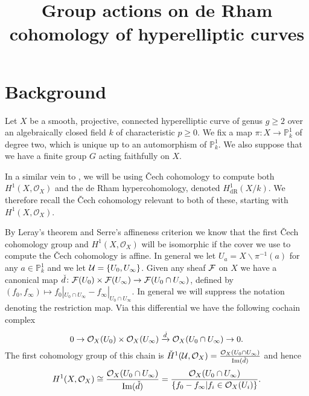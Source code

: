 \documentclass[draft, 11pt]{article} %
\title{Group actions on de Rham cohomology of hyperelliptic curves}
\author{}
\theoremstyle{plain}
\theoremstyle{remark}
\newcommand{\cO}{{\cal O}}
\newcommand{\cech}{\v{C}ech }
\newcommand{\hone}{H^1(X,\mathcal{O}_X)}
\newcommand{\cechhone}{\check{H}^1(\mathcal U,\mathcal O_X)}
\newcommand{\derhamhone}{H_{\text {dR}}^1(X/k)}
\DeclareMathOperator{\Ima}{Im}
\begin{document}
\maketitle

\listoftodos

\section{Background}


Let $X$ be a smooth, projective, connected hyperelliptic curve of genus $g \geq 2$ over an algebraically closed field $k$ of characteristic $p \geq 0$.
We  fix a map $\pi \colon X \rightarrow \mathbb P_k^1$ of degree two, which is unique up to an automorphism of $\mathbb P_k^1$.
We also suppose that we have a finite group $G$ acting faithfully on $X$.

In a similar vein to \cite{canonicalrepresentation}, we will be using \cech cohomology to compute both $\hone$ and the de Rham hypercohomology, denoted $\derhamhone$.
We therefore recall the \cech cohomology relevant to both of these, starting with $\hone$.

By Leray's theorem \cite[Thm 5.2.12]{liu} and Serre's affineness criterion \cite[Thm 5.2.23]{liu} we know that the first \cech cohomology group and $\hone$ will be isomorphic if the cover we use to compute the \cech cohomology is affine.
In general we let $U_a = X \backslash \pi^{-1}(a)$ for any $a \in \mathbb P_k^1$ and we let ${\cal U} = \{ U_0, U_\infty\}$.
Given any sheaf $\cal F$ on $X$ we have a canonical map $\check{d}\colon {\cal F}(U_0) \times {\cal F} (U_\infty) \rightarrow {\cal F}(U_0 \cap U_\infty)$, defined by $(f_0,f_\infty) \mapsto f_0|_{U_0 \cap U_\infty} - f_\infty|_{U_0 \cap U_\infty}$.
In general we will suppress the notation denoting the restriction map.
Via this differential we have the following cochain complex
\begin{equation*}
0 \rightarrow \cO_X(U_0)\times \cO_X(U_\infty) \xrightarrow{\check{d}} \cO_X(U_0 \cap U_\infty) \rightarrow 0.
\end{equation*}
The first cohomology group of this chain is $\cechhone = \frac{\cO_X(U_0 \cap U_\infty)}{\Ima(\check{d})}$ and hence
\begin{equation}\label{cechhone}
\hone \cong \frac{\cO_X(U_0 \cap U_\infty)}{\Ima(\check{d})}  
 = \frac{\cO_X(U_0 \cap U_\infty)}{\{f_0 - f_\infty | f_i \in \cO_X(U_i) \}}.
\end{equation}
\end{document}
